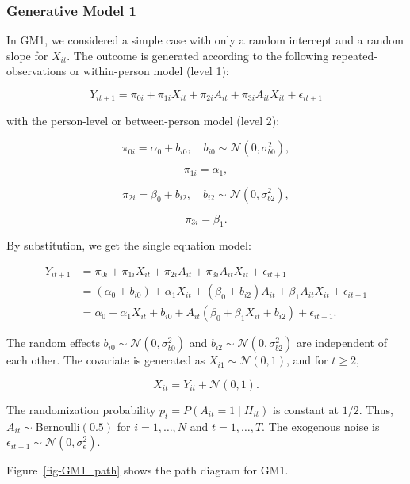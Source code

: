 \documentclass[
  12pt,
  a4paper,
]{article}
\begin{document}
\subsubsection{Generative Model 1}\label{generative-model-1}

In GM1, we considered a simple case with only a random intercept and a
random slope for \(X_{it}\). The outcome is generated according to the
following repeated-observations or within-person model (level 1):

\[
Y_{it+1} = \pi_{0i} + \pi_{1i} X_{it} + \pi_{2i} A_{it} + \pi_{3i} A_{it} X_{it} + \epsilon_{it+1}
\]

with the person-level or between-person model (level 2):

\[
\pi_{0i} = \alpha_0 + b_{i0}, \quad b_{i0} \sim \mathcal{N}(0, \sigma_{b0}^2),
\]

\[
\pi_{1i} = \alpha_1,
\]

\[
\pi_{2i} = \beta_0 + b_{i2}, \quad b_{i2} \sim \mathcal{N}(0, \sigma_{b2}^2),
\]

\[
\pi_{3i} = \beta_1.
\]

By substitution, we get the single equation model:

\[
\begin{aligned}
Y_{it+1} &= \pi_{0i} + \pi_{1i} X_{it} + \pi_{2i} A_{it} + \pi_{3i} A_{it} X_{it} + \epsilon_{it+1} \\
&= (\alpha_0 + b_{i0}) + \alpha_1 X_{it} + (\beta_0 + b_{i2}) A_{it} + \beta_1 A_{it} X_{it} + \epsilon_{it+1} \\
&= \alpha_0 + \alpha_1 X_{it} + b_{i0} + A_{it} (\beta_0 + \beta_1 X_{it} + b_{i2}) + \epsilon_{it+1}.
\end{aligned}
\]

The random effects \(b_{i0} \sim \mathcal{N}(0, \sigma_{b0}^2)\) and
\(b_{i2} \sim \mathcal{N}(0, \sigma_{b2}^2)\) are independent of each
other. The covariate is generated as \(X_{i1} \sim \mathcal{N}(0, 1)\),
and for \(t \geq 2\),

\[
X_{it} = Y_{it} + \mathcal{N}(0, 1).
\]

The randomization probability \(p_t = P(A_{it} = 1 \mid H_{it})\) is
constant at \(1/2\). Thus, \(A_{it} \sim \text{Bernoulli}(0.5)\) for
\(i = 1, \ldots, N\) and \(t = 1, \ldots, T\). The exogenous noise is
\(\epsilon_{it+1} \sim \mathcal{N}(0, \sigma_\epsilon^2)\).

Figure~\ref{fig-GM1_path} shows the path diagram for GM1.
\end{document}
